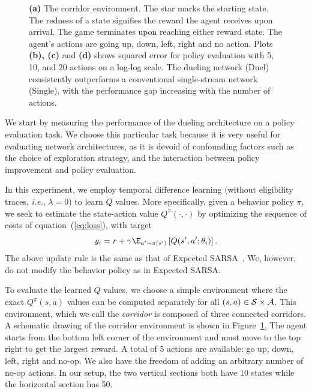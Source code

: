 \begin{figure}[t]
\begin{center}
\end{center}
\caption{{\bf (a)} The corridor environment. The star marks the starting state. 
		The redness of a state signifies the reward the agent receives upon arrival. 
		The game terminates upon reaching either reward state. 
		The agent's actions are going up, down, left, right and no action.
Plots {\bf(b), (c)} and {\bf(d)} shows squared error for policy evaluation with 5, 10, and 20 actions on a log-log scale. The dueling network (Duel) consistently outperforms a conventional single-stream network (Single), with the performance gap increasing with the number of actions.
	\label{fig:corrResults}}
\end{figure}


We start by measuring the performance of the dueling architecture on a policy evaluation task.
We choose this particular task because it is very useful for evaluating network architectures,
as it is devoid of confounding factors 
such as the choice of exploration strategy, and the interaction between policy improvement and
policy evaluation.


In this experiment, we employ temporal difference learning (without eligibility traces, \emph{i.e.}, $\lambda = 0$) to learn $Q$ values.
More specifically, given a behavior policy $\pi$, we seek to estimate
the state-action value $Q^{\pi}(\cdot, \cdot)$ by optimizing the sequence of costs of equation~(\ref{eq:loss}), with target
\begin{equation*}
y_i =  r +  \gamma  \E_{a' \sim \pi(s')}\left[ Q(s',a';\theta_i) \right]. 
\end{equation*}
The above update rule is the same as that of Expected SARSA~\cite{vanSeijen:2009}.
We, however, do not modify the behavior policy as in Expected SARSA.

To evaluate the learned $Q$ values, 
we choose a simple environment 
where the exact $Q^\pi(s,a)$ values can be computed separately for all $(s,a) \in \cal{S} \times \cal{A}$.
This environment, which we call the {\it corridor} is composed of three connected corridors.
A schematic drawing of the corridor environment is shown in Figure~\ref{fig:corrResults}, 
The agent starts from the bottom left corner of the environment and must move to the top right to get the largest reward.
A total of $5$ actions are available: go up, down, left, right and
no-op. We also have the freedom of adding an arbitrary number of no-op actions.
In our setup, the two vertical sections both have 10 states while the horizontal 
section has 50.


